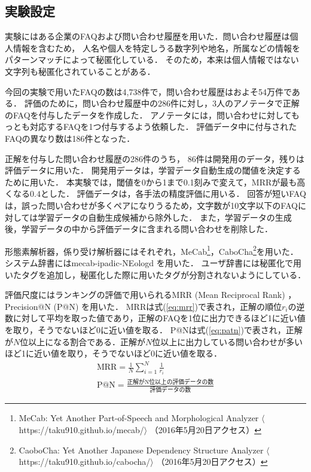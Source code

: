 \documentclass[japanese]{jnlp_1.4}
\begin{document}
\subsection{実験設定}

実験にはある企業のFAQおよび問い合わせ履歴を用いた．問い合わせ履歴は個人情報を含むため，
人名や個人を特定しうる数字列や地名，所属などの情報をパターンマッチによって秘匿化している．
そのため，本来は個人情報ではない文字列も秘匿化されていることがある．

今回の実験で用いたFAQの数は4,738件で，問い合わせ履歴はおよそ54万件である．
評価のために，問い合わせ履歴中の286件に対し，3人のアノテータで正解のFAQを付与したデータを作成した．
アノテータには，問い合わせに対してもっとも対応するFAQを1つ付与するよう依頼した．
評価データ中に付与されたFAQの異なり数は186件となった．

正解を付与した問い合わせ履歴の286件のうち，
86件は開発用のデータ，残りは評価データに用いた．
開発用データは，学習データ自動生成の閾値を決定するために用いた．
本実験では，閾値を0から1まで0.1刻みで変えて，MRRが最も高くなる$0.4$とした．
評価データは，各手法の精度評価に用いる．
回答が短いFAQは，誤った問い合わせが多くペアになりうるため，文字数が10文字以下のFAQに対しては学習データの自動生成候補から除外した． 
また，学習データの生成後，学習データの中から評価データに含まれる問い合わせを削除した．

形態素解析器，係り受け解析器にはそれぞれ，MeCab\footnote{MeCab: Yet Another Part-of-Speech and Morphological Analyzer $\langle$https://taku910.github.io/mecab/$\rangle$ （2016年5月20日アクセス）}，CaboCha\footnote{CaoboCha: Yet Another Japanese Dependency Structure Analyzer $\langle$https://taku910.github.io/cabocha/$\rangle$ （2016年5月20日アクセス）}を用いた．
システム辞書にはmecab-ipadic-NEologd \cite{sato:15} を用いた．
ユーザ辞書には秘匿化で用いたタグを追加し，秘匿化した際に用いたタグが分割されないようにしている．


評価尺度にはランキングの評価で用いられるMRR (Mean Reciprocal Rank) ，Precision@N (P@N) を用いた．
MRRは式(\ref{eq:mrr})で表され，正解の順位$r_i$の逆数に対して平均を取った値であり，正解のFAQを1位に出力できるほど1に近い値を取り，そうでないほど0に近い値を取る．
P@Nは式(\ref{eq:patn})で表され，正解が$N$位以上になる割合である．正解が$N$位以上に出力している問い合わせが多いほど1に近い値を取り，そうでないほど0に近い値を取る．
{\allowdisplaybreaks
\begin{gather}
  \textrm{MRR} = \frac{1}{N} \sum_{i=1}^{N} \frac{1}{r_i}
  \label{eq:mrr} \\[1ex]
  \textrm{P@N} = \frac{\textrm{正解がN位以上の評価データの数}}{\textrm{評価データの数}}
  \label{eq:patn}
\end{gather}
}
\end{document}
